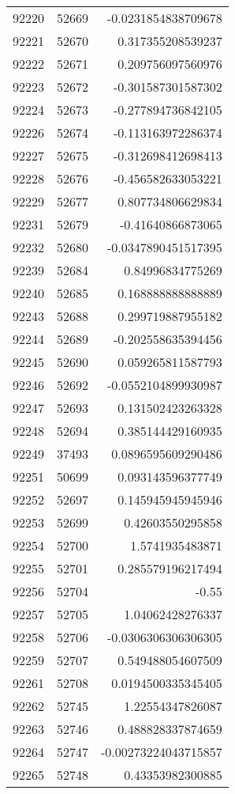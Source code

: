 \begin{tabular}{r | r | r}
92220 & 52669 & -0.0231854838709678 \\
92221 & 52670 & 0.317355208539237 \\
92222 & 52671 & 0.209756097560976 \\
92223 & 52672 & -0.301587301587302 \\
92224 & 52673 & -0.277894736842105 \\
92226 & 52674 & -0.113163972286374 \\
92227 & 52675 & -0.312698412698413 \\
92228 & 52676 & -0.456582633053221 \\
92229 & 52677 & 0.807734806629834 \\
92231 & 52679 & -0.41640866873065 \\
92232 & 52680 & -0.0347890451517395 \\
92239 & 52684 & 0.84996834775269 \\
92240 & 52685 & 0.168888888888889 \\
92243 & 52688 & 0.299719887955182 \\
92244 & 52689 & -0.202558635394456 \\
92245 & 52690 & 0.059265811587793 \\
92246 & 52692 & -0.0552104899930987 \\
92247 & 52693 & 0.131502423263328 \\
92248 & 52694 & 0.385144429160935 \\
92249 & 37493 & 0.0896595609290486 \\
92251 & 50699 & 0.093143596377749 \\
92252 & 52697 & 0.145945945945946 \\
92253 & 52699 & 0.42603550295858 \\
92254 & 52700 & 1.5741935483871 \\
92255 & 52701 & 0.285579196217494 \\
92256 & 52704 & -0.55 \\
92257 & 52705 & 1.04062428276337 \\
92258 & 52706 & -0.0306306306306305 \\
92259 & 52707 & 0.549488054607509 \\
92261 & 52708 & 0.0194500335345405 \\
92262 & 52745 & 1.22554347826087 \\
92263 & 52746 & 0.488828337874659 \\
92264 & 52747 & -0.00273224043715857 \\
92265 & 52748 & 0.43353982300885 \\

\end{tabular}
